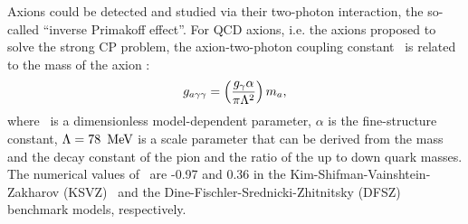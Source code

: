 Axions could be detected and studied via their two-photon interaction, the
so-called ``inverse Primakoff effect''. For QCD axions, i.e. the axions 
proposed to solve the strong CP problem, the axion-two-photon coupling 
constant \bgagg\ is related to the mass of the axion \ma: 
\begin{equation}
 g_{a\gamma\gamma} = \left(\frac{g_{\gamma}\alpha}{\pi \Lambda^2}\right)m_a, 
\label{eq:grelation}
\end{equation}
where \bggamma\ is a dimensionless model-dependent parameter, $\alpha$ is the 
fine-structure constant, $\Lambda=78~\,\text{Me\hspace{-.08em}V}$ is a scale parameter that can 
be derived from the mass and the decay constant of the pion and the ratio of 
the up to down quark masses. 
The numerical values of \bggamma\ are -0.97 and 0.36 
in the Kim-Shifman-Vainshtein-Zakharov (KSVZ)~\cite{KSVZI,KSVZII} and 
the Dine-Fischler-Srednicki-Zhitnitsky (DFSZ)~\cite{DFSZI,DFSZII} benchmark 
models, respectively. 
%
%
% 

